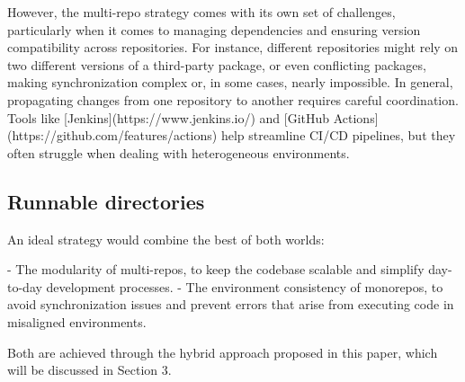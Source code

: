 \documentclass{article}
\begin{document}
However, the multi-repo strategy comes with its own set of challenges,
particularly when it comes to managing dependencies and ensuring version
compatibility across repositories. For instance, different repositories might
rely on two different versions of a third-party package, or even conflicting
packages, making synchronization complex or, in some cases, nearly impossible.
In general, propagating changes from one repository to another requires careful
coordination. Tools like [Jenkins](https://www.jenkins.io/) and
[GitHub Actions](https://github.com/features/actions) help streamline CI/CD
pipelines, but they often struggle when dealing with heterogeneous environments.

\subsection{Runnable directories}

An ideal strategy would combine the best of both worlds:

- The modularity of multi-repos, to keep the codebase scalable and simplify
  day-to-day development processes.
- The environment consistency of monorepos, to avoid synchronization issues and
  prevent errors that arise from executing code in misaligned environments.

Both are achieved through the hybrid approach proposed in this paper, which will
be discussed in Section 3.
\end{document}
